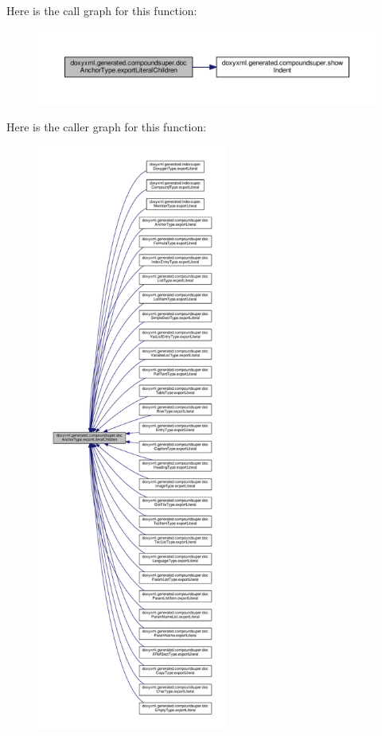 Here is the call graph for this function\+:
\nopagebreak
\begin{figure}[H]
\begin{center}
\leavevmode
\includegraphics[width=350pt]{db/df1/classdoxyxml_1_1generated_1_1compoundsuper_1_1docAnchorType_af42bae9c68213f1e4692411909c72380_cgraph}
\end{center}
\end{figure}




Here is the caller graph for this function\+:
\nopagebreak
\begin{figure}[H]
\begin{center}
\leavevmode
\includegraphics[height=550pt]{db/df1/classdoxyxml_1_1generated_1_1compoundsuper_1_1docAnchorType_af42bae9c68213f1e4692411909c72380_icgraph}
\end{center}
\end{figure}


